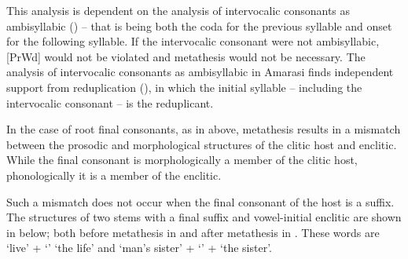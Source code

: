 This analysis is dependent on the analysis of intervocalic
consonants as ambisyllabic () --
that is being both the coda for the previous syllable
and onset for the following syllable.
If the intervocalic consonant were not ambisyllabic,
[PrWd] would not be violated
and metathesis would not be necessary.
The analysis of intervocalic consonants as ambisyllabic in Amarasi
finds independent support from reduplication (),
in which the initial syllable -- including the intervocalic consonant --
is the reduplicant.

In the case of root final consonants,
as in  above, metathesis results in a mismatch between the prosodic
and morphological structures of the clitic host and enclitic.
While the final consonant is morphologically a member of
the clitic host, phonologically it is a member of the enclitic.

Such a mismatch does not occur when the final
consonant of the host is a suffix.
The structures of two stems with a final suffix and vowel-initial
enclitic are shown in  below;
both before metathesis in  and after metathesis in .
These words are  `live' +  `{\at}' {\ra}  `the life'
and  `man's sister' +  `{\F}' + {\ee} {\ra}  `the sister'.

